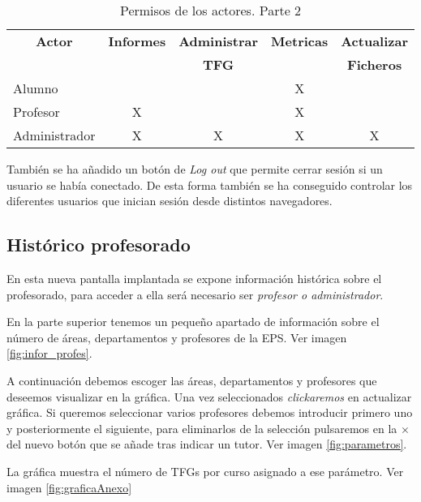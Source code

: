  \begin{table}[]
	\label{actores2}
	\centering
	\begin{tabular}{|l|c|c|c|c|}
		\hline
		\multicolumn{1}{|c|}{\textbf{Actor}}     &  \textbf{Informes} & \textbf{Administrar} & \textbf{Metricas} & \textbf{Actualizar}\\
		\multicolumn{1}{|c|}{}     & {} & \textbf{TFG} & {} & \textbf{Ficheros}\\\hline
		Alumno & {} & {} & X & {} \\ \hline
		Profesor  & X & {} & X   & {}  \\ \hline
		Administrador   & X & X & X  & X  \\ \hline
	\end{tabular}
	\caption{Permisos de los actores. Parte 2}
\end{table}

También se ha añadido un botón de \emph{Log out} que permite cerrar sesión si un usuario se había conectado. 
De esta forma también se ha conseguido controlar los diferentes usuarios que inician sesión desde distintos navegadores.
\subsection{Histórico profesorado}
En esta nueva pantalla implantada se expone información histórica sobre el profesorado, para acceder a ella será necesario ser \emph{profesor o administrador}.

En la parte superior tenemos un pequeño apartado de información sobre el número de áreas, departamentos y profesores de la EPS. Ver imagen \ref{fig:infor_profes}.


A continuación debemos escoger las áreas, departamentos y profesores que deseemos visualizar en la gráfica. Una vez seleccionados \emph{clickaremos} en actualizar gráfica.
Si queremos seleccionar varios profesores debemos introducir primero uno y posteriormente el siguiente, para eliminarlos de la selección pulsaremos en la $\times$ del nuevo botón que se añade tras indicar un tutor. Ver imagen \ref{fig:parametros}.


La gráfica muestra el número de TFGs por curso asignado a ese parámetro. Ver imagen \ref{fig:graficaAnexo}



